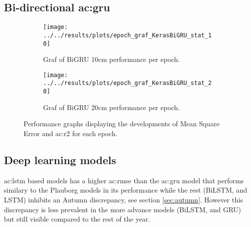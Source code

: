 \subsection{Bi-directional \acrfull{ac:gru}}
\begin{figure}
	\begin{subfigure}{0.45\textwidth}
		\centering
		\begin{adjustwidth}{-1in}{-1in}
			\texttt{[image: ../../results/plots/epoch\_graf\_KerasBiGRU\_stat\_10]}
		\end{adjustwidth}
		\caption[Epoch graph BiGRU 10cm]{Graf of BiGRU 10cm performance per epoch.}
		\label{fig:epochgrafKerasBiGRUstat10}
	\end{subfigure}
	\begin{subfigure}{0.45\textwidth}
		\centering
		\begin{adjustwidth}{-1in}{-1in}
			\texttt{[image: ../../results/plots/epoch\_graf\_KerasBiGRU\_stat\_20]}
		\end{adjustwidth}
		\caption[Epoch graph BiGRU 20cm]{Graf of BiGRU 20cm performance per epoch.}
		\label{fig:epochgrafKerasBiGRUstat20}
	\end{subfigure}
	\caption{Performance graphs displaying the developments of Mean Square Error and \acrfull{ac:r2} for each epoch.}
\end{figure}



\subsection{Deep learning models}

\acrshort{ac:lstm} based models has a higher \acrshort{ac:rmse} than the \acrshort{ac:gru} model that performs similary to the Plauborg models in its performance while the rest (BiLSTM, and LSTM) inhibits an Autumn discrepancy, see section \ref{sec:autumn}. However this discrepancy is less prevalent in the more advance models (BiLSTM, and GRU) but still visible compared to the rest of the year.


